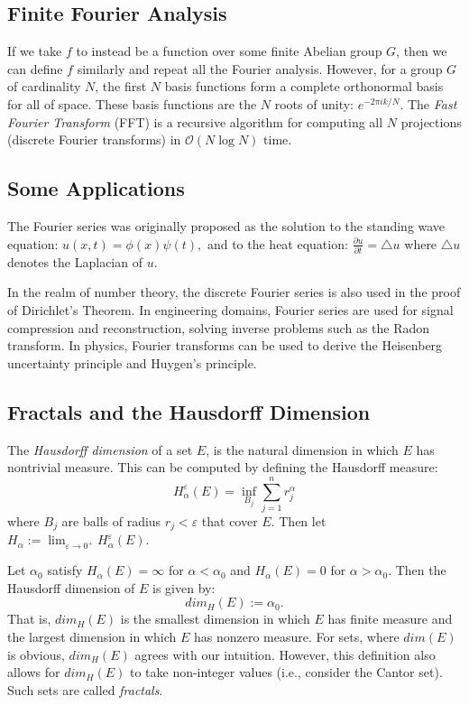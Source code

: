 \documentclass[12pt]{article}
\begin{document}
\subsection*{Finite Fourier Analysis}

If we take $f$ to instead be a function over some finite Abelian group $G$, then
we can define $f$ similarly and repeat all the Fourier analysis.
However, for a group $G$ of cardinality $N$, the first $N$ basis functions
form a complete orthonormal basis for all of space.
These basis functions are the $N$ roots of unity: $e^{-2\pi i k /N}$.
The {\it Fast Fourier Transform} (FFT) is a recursive algorithm for computing
all $N$ projections (discrete Fourier transforms) in $\mathcal{O}(N\log N)$ 
time.

\subsection*{Some Applications}

The Fourier series was originally proposed as the solution to the standing
wave equation:
$u(x,t) = \phi(x)\psi(t),$ and to the heat equation:
$\frac{\partial u}{\partial t} = \triangle u$
where $\triangle u$ denotes the Laplacian of $u$.

In the realm of number theory, the discrete Fourier series is also used in the
proof of Dirichlet's Theorem.
In engineering domains, Fourier series are used for signal compression and 
reconstruction, solving inverse problems such as the Radon transform.
In physics, Fourier transforms can be used to derive the Heisenberg uncertainty 
principle and Huygen's principle.

\subsection*{Fractals and the Hausdorff Dimension}

The {\it Hausdorff dimension} of a set $E$, is the natural dimension
in which $E$ has nontrivial measure.
This can be computed by defining the Hausdorff measure:
$$
H^\varepsilon_\alpha(E) = \inf_{B_j} \sum_{j=1}^n r_j^\alpha
$$
where $B_j$ are balls of radius $r_j < \varepsilon$ that cover $E$.
Then let 
$H_\alpha := \lim_{\varepsilon\rightarrow 0^+} H^\varepsilon_{\alpha}(E)$.

Let $\alpha_0$ satisfy $H_\alpha(E) = \infty$ for $\alpha < \alpha_0$ and 
$H_\alpha(E) = 0$ for $\alpha > \alpha_0$.
Then the Hausdorff dimension of $E$ is given by:
$$dim_{H}(E) := \alpha_0.$$
That is, $dim_H(E)$ is the smallest dimension in which $E$ has finite measure
and the largest dimension in which $E$ has nonzero measure.
For sets, where $dim(E)$ is obvious, $dim_H(E)$ agrees with our intuition.
However, this definition also allows for $dim_H(E)$ to take non-integer values
(i.e., consider the Cantor set).
Such sets are called {\it fractals}.
\end{document}
